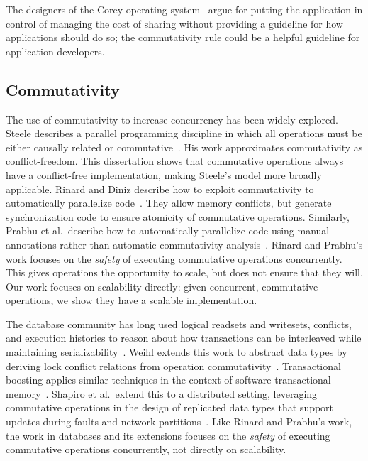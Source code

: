 The designers of the Corey operating system~\cite{boyd-wickizer:corey} argue for
putting the application in control of managing the cost of sharing without
providing a guideline for how applications should do so;
the commutativity rule could be a helpful guideline
for application developers.

\subsection{Commutativity}


The use of commutativity to increase concurrency has been widely explored.
%
Steele describes a parallel programming discipline in which all operations must
be either
causally related or commutative~\cite{steele:commutativity}.  His work
approximates commutativity as conflict-freedom.  This dissertation
shows that commutative
operations always have a conflict-free implementation, making Steele's model
more broadly applicable.
%
Rinard and
Diniz describe how to exploit commutativity to automatically parallelize
code~\cite{rinard:commutativity}.  They allow memory conflicts, but generate
synchronization code to ensure atomicity of commutative operations.
%
Similarly, Prabhu et al.\ describe how to automatically parallelize code using
manual annotations rather than automatic commutativity
analysis~\cite{prabhu:cset}.
%
Rinard and Prabhu's work focuses
on the \emph{safety} of executing commutative operations concurrently.  This
gives operations the opportunity to scale, but does not ensure that they will.
Our work focuses on scalability directly: given concurrent, commutative
operations, we show they have a scalable implementation.

The database community has long used logical readsets and writesets, conflicts,
and execution histories to reason about how transactions can be interleaved
while maintaining serializability~\cite{bernstein:concurrency}.
%
Weihl extends this work to abstract data types by deriving lock conflict
relations from operation commutativity~\cite{weihl:commutativity}.
Transactional boosting applies similar techniques in the context of software
transactional memory~\cite{herlihy:boosting}.
%
Shapiro et al.\ extend this to a distributed setting, leveraging commutative
operations in the design of replicated data types that support updates during
faults and network partitions~\cite{shapiro:conflict-free,shapiro:convergent}.
%
Like Rinard and Prabhu's work, the work in databases and its extensions
focuses on the \emph{safety} of executing commutative operations concurrently,
not directly on scalability.

